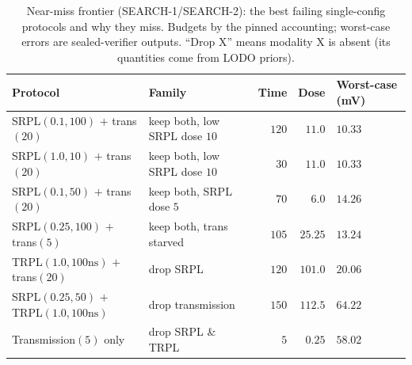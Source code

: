 \documentclass[11pt]{article}
\begin{document}
\begin{table}[t]
\centering
\caption{Near-miss frontier (SEARCH-1/SEARCH-2): the best failing single-config protocols and why they miss. Budgets by the pinned accounting; worst-case errors are sealed-verifier outputs. ``Drop X'' means modality X is absent (its quantities come from LODO priors).}
\label{tab:frontier}
\begin{tabular}{llrrl}
\toprule
Protocol & Family & Time & Dose & Worst-case (mV) \\
\midrule
SRPL$(0.1,100)$ $+$ trans$(20)$   & keep both, low SRPL dose $10$ & $120$ & $11.0$  & $10.33$ \\
SRPL$(1.0,10)$ $+$ trans$(20)$    & keep both, low SRPL dose $10$ & $30$  & $11.0$  & $10.33$ \\
SRPL$(0.1,50)$ $+$ trans$(20)$    & keep both, SRPL dose $5$      & $70$  & $6.0$   & $14.26$ \\
SRPL$(0.25,100)$ $+$ trans$(5)$   & keep both, trans starved      & $105$ & $25.25$ & $13.24$ \\
TRPL$(1.0,100\text{ns})$ $+$ trans$(20)$ & drop SRPL              & $120$ & $101.0$ & $20.06$ \\
SRPL$(0.25,50)$ $+$ TRPL$(1.0,100\text{ns})$ & drop transmission & $150$ & $112.5$ & $64.22$ \\
Transmission$(5)$ only            & drop SRPL \& TRPL             & $5$   & $0.25$  & $58.02$ \\
\bottomrule
\end{tabular}
\end{table}
\end{document}
